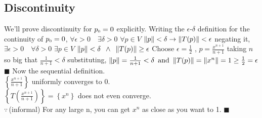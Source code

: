 \documentclass[12pt]{article}
\begin{document}
	\subsection{Discontinuity}
	We'll prove discontinuity for $p_{\text{\tiny{0}}} = 0 $ explicitly. \newline
	\newline
	Writing the $\epsilon $-$ \delta $ definition for the continuity of $p_{\text{\tiny{0}}} = 0 $, \newline
	\phantom{\quad \, \,} $ \forall \epsilon >0 \quad \exists \delta>0 $ \quad
	$\forall p \in V$ \quad
	$ \Arrowvert p \Arrowvert < \delta \rightarrow \Arrowvert T(p) \Arrowvert < \epsilon $ \quad \newline
	negating it, \newline
	\phantom{\quad \, \,} $ \exists \epsilon>0 \quad  \forall \delta>0
	$ \quad $\exists p \in V$ \quad $ \Arrowvert p \Arrowvert < \delta \, \, \, \wedge \, \, \,
	 \Arrowvert T(p) \Arrowvert \geq \epsilon $ \quad \newline \newline
	 Choose $\epsilon = \frac{1}{2} $ , $p=\frac{x^{n+1}}{n+1}$ taking $n$ so big that $\frac{1}{n+1} < \delta$ \newline
	 substituting, \quad $ \Arrowvert p \Arrowvert = \frac{1}{n+1} < \delta \, \, \, \text{and} \, \, \,
	 \Arrowvert T(p) \Arrowvert = \Arrowvert x^n \Arrowvert = 1 \geq \frac{1}{2} = \epsilon $ \hfill$\blacksquare$ \newline
	 \quad \newline \newline
	 Now the sequential definition. \vspace{5pt} \\
	 $\left\{ \frac{x^{n+1}}{n+1} \right\}$ uniformly converges to 0. 
	 \vspace{5pt} \ \\
	 $\left\{ T\left( \frac{x^{n+1}}{n+1} \right)  \right\} = 
	 \left\{ x^n  \right\} $ does not even converge. 
	 \vspace{5pt} \ \\ \phantom{\quad \, \,}  $\because$\,(informal) For any large n, you can get $x^n$ as close as you want to 1. \hfill$\blacksquare$ \newline
 
 
\end{document}
